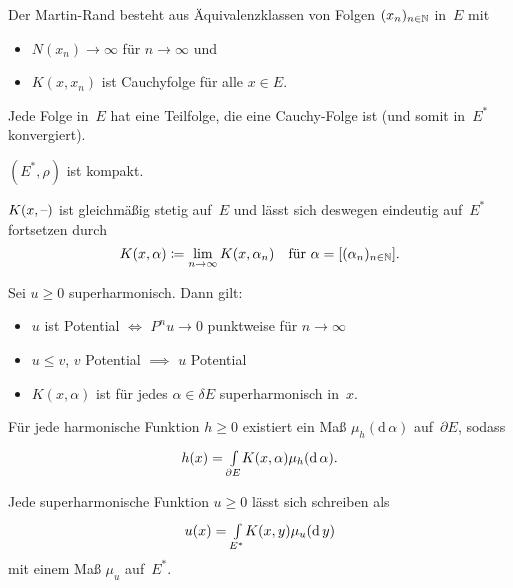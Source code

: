 \documentclass{cheat-sheet}
\begin{document}
\begin{bem}
  Der Martin-Rand besteht aus Äquivalenzklassen von Folgen $(x_n)_{n \in \mathbb{N}}$ in~$E$ mit
  \begin{itemize}
    \item $N(x_n) \to \infty$ für $n \to \infty$ und
    \item $K(x, x_n)$ ist Cauchyfolge für alle $x \in E$.
  \end{itemize}
\end{bem}

\begin{lem}
  Jede Folge in~$E$ hat eine Teilfolge, die eine Cauchy-Folge ist (und somit in~$E^*$ konvergiert).
\end{lem}

\begin{kor}
  $(E^*, \rho)$ ist kompakt.
\end{kor}

\begin{lemdefn}
  $K(x, \text{--})$ ist gleichmäßig stetig auf~$E$ und lässt sich deswegen eindeutig auf~$E^*$ fortsetzen durch
  \[
    K(x, \alpha) \coloneqq \lim_{n \to \infty} K(x, \alpha_n) \quad
    \text{für } \alpha = [(\alpha_n)_{n \in \mathbb{N}}].
  \]
\end{lemdefn}

\begin{lem}
  Sei $u \geq 0$ superharmonisch.
  Dann gilt:
  \begin{itemize}
    \item $u$ ist Potential $\iff$ $P^n u \to 0$ punktweise für $n \to \infty$
    \item $u \leq v$, $v$ Potential $\implies$ $u$ Potential
    \item $K(x, \alpha)$ ist für jedes $\alpha \in \delta E$ superharmonisch in~$x$.
  \end{itemize}
\end{lem}

\begin{satz}
  Für jede harmonische Funktion $h \geq 0$ existiert ein Maß $\mu_h(\mathrm{d}\,\alpha)$ auf~$\partial E$, sodass
  \[
    h(x) = {\textstyle \int\limits_{\partial E}^{}} K(x, \alpha) \mu_h(\mathrm{d}\,\alpha).
  \]
\end{satz}

\begin{kor}
  Jede superharmonische Funktion $u \geq 0$ lässt sich schreiben als
  \[
    u(x) = {\textstyle \int\limits_{E^*}^{}} K(x, y) \mu_u(\mathrm{d}\,y)
  \]
  mit einem Maß $\mu_u$ auf~$E^*$.
\end{kor}
\end{document}
